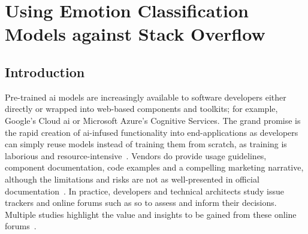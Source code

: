 \chapter[Using Emotion Classification Models against Stack Overlow]
{Using Emotion Classification Models against Stack Overflow}
\label{ch:caise2021}
\graphicspath{{mainmatter/publications/figures/caise2021/}}

\glsresetall
\begin{abstract}
Pre-trained \gls{ai} models are increasingly available as  and tool-kits to software developers, making complex \gls{ai}-enabled functionality available via standard and well-understood methods. However, reusing such models comes with risks relating to the lack of transparency of the model and training data bias, making it difficult to confidently employ the toolkit in a new situation.  Vendors are responding and proposing artefacts such as model cards and datasheets to make models and their training more transparent.  But is this enough?  As part of an empirical investigation determining if a cloud-based \glspl{iws} was ready for production use, we processed developer questions on  using a published pre-trained classifier that was specifically tuned for the software engineering domain. In this paper, we present lessons learnt from this automation effort. We found unexpected results which led us to delve into model and training data---an option available to us because the information was available for research.  We found that, had a model card and datasheet been prepared, we could have identified risks to our study much earlier on. However, model cards and datasheet specifications are not yet mature enough and additional tools and processes are still required to confirm a decision whether a trained model can be reused with confidence.
\end{abstract}
\glsresetall
{}

\section{Introduction}
Pre-trained \gls{ai} models are increasingly available to software developers either directly or wrapped into web-based components and toolkits; for example, Google's Cloud \gls{ai} or Microsoft Azure's Cognitive Services. The grand promise is the rapid creation of \gls{ai}-infused functionality into end-applications as developers can simply reuse models instead of training them from scratch, as training is laborious and resource-intensive~\citep{RamanAnandHoder2015}. Vendors do provide usage guidelines, component documentation, code examples and a compelling marketing narrative, although the limitations and risks are not as well-presented in  official documentation~\citep{Cummaudo:2019icsme,Cummaudo:2020icse}. 
In practice, developers and technical architects study issue trackers and online forums such as \gls{so} to assess and inform their decisions.  Multiple studies highlight the value and insights to be gained from these online forums~\citep{Abdalkareem2017WhatOverflow,Storey2014,Cummaudo:2020icse}.

